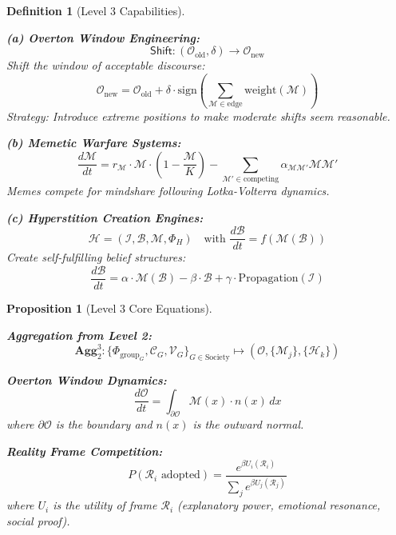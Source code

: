 \documentclass[11pt,twoside]{book}
\newcommand{\Frac}{\Phi}
\newcommand{\GroupFrac}{\Phi_{\mathrm{group}}}
\newcommand{\Overton}{\mathcal{O}}
\newcommand{\Memetic}{\mathcal{M}}
\newcommand{\Hyperstition}{\mathcal{H}}
\newcommand{\Vulnerability}{\mathcal{V}}
\newcommand{\Cascade}{\mathcal{C}}
\newcommand{\Aggregate}[2]{\mathbf{Agg}_{#1}^{#2}}
\newtheorem{definition}{Definition}[chapter]
\newtheorem{proposition}{Proposition}[chapter]
\begin{document}
\begin{definition}[Level 3 Capabilities]
\label{def:L3-capabilities}

\textbf{(a) Overton Window Engineering:}
\begin{equation}
\boxed{
    \mathsf{Shift} : (\Overton_{\mathrm{old}}, \delta) \to \Overton_{\mathrm{new}}
}
\end{equation}
Shift the window of acceptable discourse:
\[
    \Overton_{\mathrm{new}} = \Overton_{\mathrm{old}} + \delta \cdot
    \mathrm{sign}\left(\sum_{\Memetic \in \mathrm{edge}} \mathrm{weight}(\Memetic)\right)
\]
Strategy: Introduce extreme positions to make moderate shifts seem reasonable.

\textbf{(b) Memetic Warfare Systems:}
\begin{equation}
\boxed{
    \frac{d\Memetic}{dt} = r_\Memetic \cdot \Memetic \cdot \left(1 - \frac{\Memetic}{K}\right)
    - \sum_{\Memetic' \in \mathrm{competing}} \alpha_{\Memetic\Memetic'} \Memetic \Memetic'
}
\end{equation}
Memes compete for mindshare following Lotka-Volterra dynamics.

\textbf{(c) Hyperstition Creation Engines:}
\begin{equation}
\boxed{
    \Hyperstition = (\mathcal{I}, \mathcal{B}, \mathcal{M}, \Frac_H)
    \quad \text{with } \frac{d\mathcal{B}}{dt} = f(\mathcal{M}(\mathcal{B}))
}
\end{equation}
Create self-fulfilling belief structures:
\[
    \frac{d\mathcal{B}}{dt} = \alpha \cdot \mathcal{M}(\mathcal{B}) - \beta \cdot \mathcal{B}
    + \gamma \cdot \mathrm{Propagation}(\mathcal{I})
\]
\end{definition}

\begin{proposition}[Level 3 Core Equations]
\label{prop:L3-equations}

\textbf{Aggregation from Level 2:}
\begin{equation}
    \Aggregate{2}{3} : \{\GroupFrac_G, \Cascade_G, \Vulnerability_G\}_{G \in \mathrm{Society}}
    \mapsto (\Overton, \{\Memetic_j\}, \{\Hyperstition_k\})
\end{equation}

\textbf{Overton Window Dynamics:}
\begin{equation}
    \frac{d\Overton}{dt} = \int_{\partial\Overton} \Memetic(x) \cdot n(x) \, dx
\end{equation}
where $\partial\Overton$ is the boundary and $n(x)$ is the outward normal.

\textbf{Reality Frame Competition:}
\begin{equation}
    P(\mathcal{R}_i \text{ adopted}) = \frac{e^{\beta U_i(\mathcal{R}_i)}}
    {\sum_j e^{\beta U_j(\mathcal{R}_j)}}
\end{equation}
where $U_i$ is the utility of frame $\mathcal{R}_i$ (explanatory power, emotional resonance, social proof).
\end{proposition}
\end{document}
